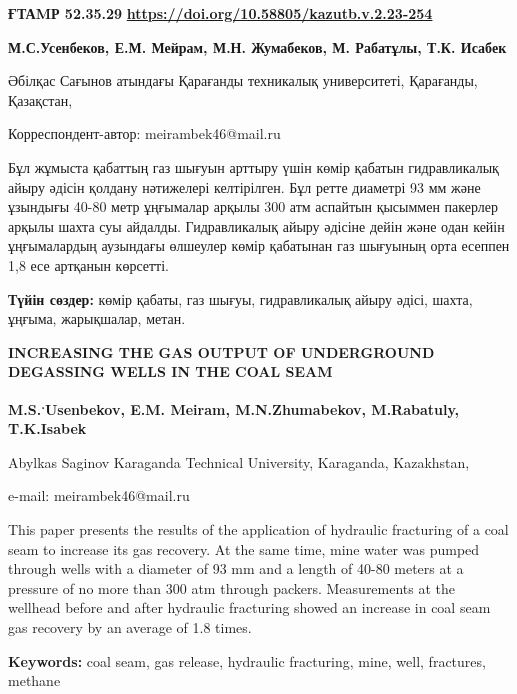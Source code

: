 \newpage
{}
{\bfseries ҒТАMР 52.35.29}
\hfill {\bfseries \href{https://doi.org/10.58805/kazutb.v.2.23-254}{https://doi.org/10.58805/kazutb.v.2.23-254}}


\begin{center}
{\bfseries М.С.Усенбеков\envelope, Е.М. Мейрам, М.Н. Жумабеков, М. Рабатұлы, Т.К. Исабек}

Әбілқас Сағынов атындағы Қарағанды техникалық университеті, Қарағанды,
Қазақстан,

{\bfseries \envelope} Корреспондент-автор: meirambek46@mail.ru
\end{center}

Бұл жұмыста қабаттың газ шығуын арттыру үшін көмір қабатын гидравликалық
айыру әдісін қолдану нәтижелері келтірілген. Бұл ретте диаметрі 93 мм
және ұзындығы 40-80 метр ұңғымалар арқылы 300 атм аспайтын қысыммен
пакерлер арқылы шахта суы айдалды. Гидравликалық айыру әдісіне дейін
және одан кейін ұңғымалардың аузындағы өлшеулер көмір қабатынан газ
шығуының орта есеппен 1,8 есе артқанын көрсетті.

{\bfseries Түйін сөздер:} көмір қабаты, газ шығуы, гидравликалық айыру
әдісі, шахта, ұңғыма, жарықшалар, метан.

\begin{center}
{\large\bfseries INCREASING THE GAS OUTPUT OF UNDERGROUND DEGASSING WELLS IN THE
COAL SEAM}

{\bfseries M.S.\textsuperscript{.}Usenbekov\envelope, E.M.
Meiram, M.N.Zhumabekov, M.Rabatuly, T.K.Isabek}

Abylkas Saginov Karaganda Technical University, Karaganda, Kazakhstan,

e-mail: meirambek46@mail.ru
\end{center}

This paper presents the results of the application of hydraulic
fracturing of a coal seam to increase its gas recovery. At the same
time, mine water was pumped through wells with a diameter of 93 mm and a
length of 40-80 meters at a pressure of no more than 300 atm through
packers. Measurements at the wellhead before and after hydraulic
fracturing showed an increase in coal seam gas recovery by an average of
1.8 times.

{\bfseries Keywords:} coal seam, gas release, hydraulic fracturing, mine,
well, fractures, methane

